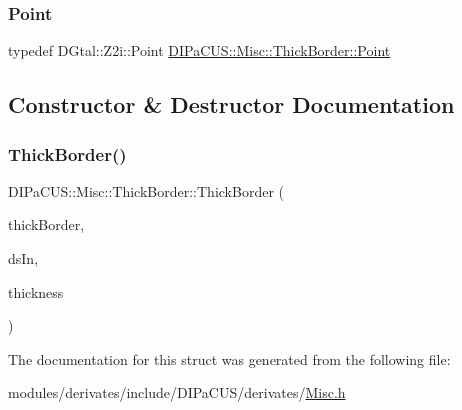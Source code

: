 \subsubsection{\texorpdfstring{Point}{Point}}
{\footnotesize\ttfamily typedef D\+Gtal\+::\+Z2i\+::\+Point \hyperlink{structDIPaCUS_1_1Misc_1_1ThickBorder_ae295c13d112a91997154ec08edcbd01d}{D\+I\+Pa\+C\+U\+S\+::\+Misc\+::\+Thick\+Border\+::\+Point}}



\subsection{Constructor \& Destructor Documentation}
\mbox{\label{structDIPaCUS_1_1Misc_1_1ThickBorder_aab612b502416009a6ae33d36830de1d6}} 
\subsubsection{\texorpdfstring{Thick\+Border()}{ThickBorder()}}
{\footnotesize\ttfamily D\+I\+Pa\+C\+U\+S\+::\+Misc\+::\+Thick\+Border\+::\+Thick\+Border (\begin{DoxyParamCaption}\item[{\hyperlink{structDIPaCUS_1_1Misc_1_1ThickBorder_a0fc2e5498fb6c524bebb4965338a9189}{Digital\+Set} \&}]{thick\+Border,  }\item[{const \hyperlink{structDIPaCUS_1_1Misc_1_1ThickBorder_a0fc2e5498fb6c524bebb4965338a9189}{Digital\+Set} \&}]{ds\+In,  }\item[{int}]{thickness }\end{DoxyParamCaption})}



The documentation for this struct was generated from the following file\+:\begin{DoxyCompactItemize}
\item 
modules/derivates/include/\+D\+I\+Pa\+C\+U\+S/derivates/\hyperlink{Misc_8h}{Misc.\+h}\end{DoxyCompactItemize}
